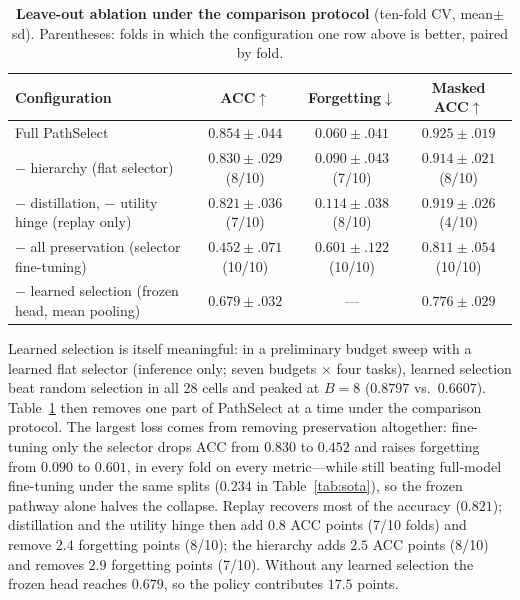 \documentclass{article}
\begin{document}
\begin{table}[t]
\centering\footnotesize
\caption{\textbf{Leave-out ablation under the comparison protocol} (ten-fold CV, mean$\pm$sd). Parentheses: folds in which the configuration one row above is better, paired by fold.}
\label{tab:leaveout}
\begin{tabular}{lccc}
\toprule
Configuration & ACC$\uparrow$ & Forgetting$\downarrow$ & Masked ACC$\uparrow$ \\
\midrule
Full PathSelect & $0.854{\pm}.044$ & $0.060{\pm}.041$ & $0.925{\pm}.019$ \\
$-$ hierarchy (flat selector) & $0.830{\pm}.029$ (8/10) & $0.090{\pm}.043$ (7/10) & $0.914{\pm}.021$ (8/10) \\
$-$ distillation, $-$ utility hinge (replay only) & $0.821{\pm}.036$ (7/10) & $0.114{\pm}.038$ (8/10) & $0.919{\pm}.026$ (4/10) \\
$-$ all preservation (selector fine-tuning) & $0.452{\pm}.071$ (10/10) & $0.601{\pm}.122$ (10/10) & $0.811{\pm}.054$ (10/10) \\
$-$ learned selection (frozen head, mean pooling) & $0.679{\pm}.032$ & --- & $0.776{\pm}.029$ \\
\bottomrule
\end{tabular}
\end{table}

Learned selection is itself meaningful: in a preliminary budget sweep with a learned flat selector (inference only; seven budgets $\times$ four tasks), learned selection beat random selection in all 28 cells and peaked at $B=8$ ($0.8797$ vs.\ $0.6607$).
Table~\ref{tab:leaveout} then removes one part of PathSelect at a time under the comparison protocol.
The largest loss comes from removing preservation altogether: fine-tuning only the selector drops ACC from $0.830$ to $0.452$ and raises forgetting from $0.090$ to $0.601$, in every fold on every metric---while still beating full-model fine-tuning under the same splits ($0.234$ in Table~\ref{tab:sota}), so the frozen pathway alone halves the collapse.
Replay recovers most of the accuracy ($0.821$); distillation and the utility hinge then add $0.8$ ACC points (7/10 folds) and remove $2.4$ forgetting points (8/10); the hierarchy adds $2.5$ ACC points (8/10) and removes $2.9$ forgetting points (7/10).
Without any learned selection the frozen head reaches $0.679$, so the policy contributes $17.5$ points.
\end{document}
